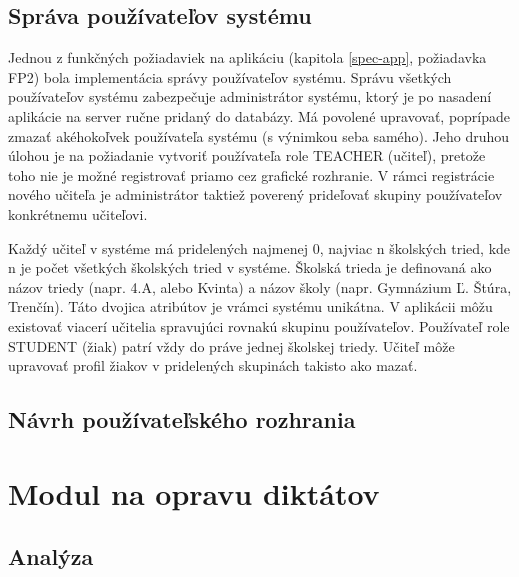 \documentclass[12pt,oneside]{fithesis2}
\begin{document}
\section{Správa používateľov systému} \label{pouzivatelia-sprava}
\par Jednou z funkčných požiadaviek na aplikáciu (kapitola \ref{spec-app}, požiadavka FP2) bola implementácia správy používateľov systému. Správu všetkých používateľov systému zabezpečuje administrátor systému, ktorý je po nasadení aplikácie na server ručne pridaný do databázy. Má povolené upravovať, poprípade zmazať akéhokoľvek používateľa systému (s výnimkou seba samého). Jeho druhou úlohou je na požiadanie vytvoriť používateľa role TEACHER (učiteľ), pretože toho nie je možné registrovať priamo cez grafické rozhranie. V rámci registrácie nového učiteľa je administrátor taktiež poverený prideľovať skupiny používateľov konkrétnemu učiteľovi.
\par Každý učiteľ v systéme má pridelených najmenej 0, najviac n školských tried, kde n je počet všetkých školských tried v systéme. Školská trieda je definovaná ako názov triedy (napr. 4.A, alebo Kvinta) a názov školy (napr. Gymnázium Ľ. Štúra, Trenčín). Táto dvojica atribútov je vrámci systému unikátna. V aplikácii môžu existovať viacerí učitelia spravujúci rovnakú skupinu používateľov. Používateľ role STUDENT (žiak) patrí vždy do práve jednej školskej triedy. Učiteľ môže upravovať profil žiakov v pridelených skupinách takisto ako mazať.

\section{Návrh používateľského rozhrania}

      \chapter{Modul na opravu diktátov} \label{modul-diktaty}
      \section{Analýza}
\end{document}
